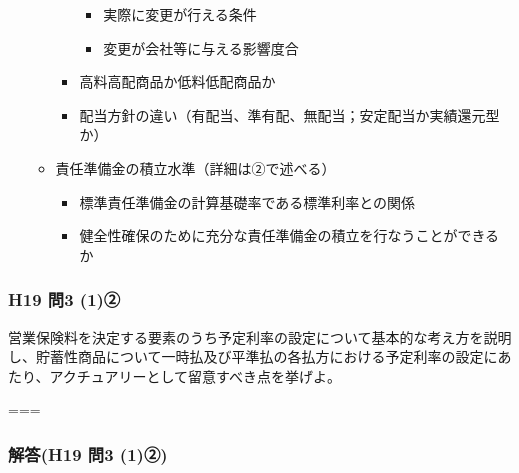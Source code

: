 \documentclass[]{article}
\begin{document}
\begin{itemize}
\begin{itemize}
\begin{itemize}
      \begin{itemize}
      \tightlist
      \item
        実際に変更が行える条件
      \item
        変更が会社等に与える影響度合
      \end{itemize}
    \item
      高料高配商品か低料低配商品か
    \item
      配当方針の違い（有配当、準有配、無配当；安定配当か実績還元型か）
    \end{itemize}
  \item
    責任準備金の積立水準（詳細は②で述べる）

    \begin{itemize}
    \tightlist
    \item
      標準責任準備金の計算基礎率である標準利率との関係
    \item
      健全性確保のために充分な責任準備金の積立を行なうことができるか
    \end{itemize}
  \end{itemize}
\end{itemize}

\hypertarget{h19-ux554f3-1ux2461}{%
\subsubsection{H19 問3 (1)②}\label{h19-ux554f3-1ux2461}}

営業保険料を決定する要素のうち予定利率の設定について基本的な考え方を説明し、貯蓄性商品について一時払及び平準払の各払方における予定利率の設定にあたり、アクチュアリーとして留意すべき点を挙げよ。

===

\hypertarget{ux89e3ux7b54h19-ux554f3-1ux2461}{%
\subsubsection{解答(H19 問3
(1)②)}\label{ux89e3ux7b54h19-ux554f3-1ux2461}}
\end{document}
